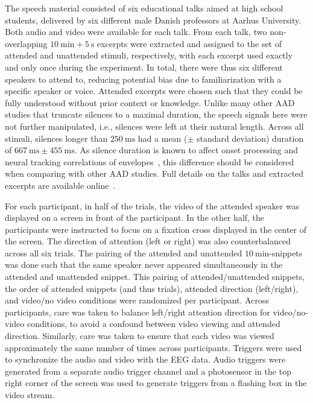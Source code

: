 \documentclass[fleqn,10pt]{wlscirep}
\begin{document}
	The speech material consisted of six educational talks aimed at high school students, delivered by six different male Danish professors at Aarhus University. Both audio and video were available for each talk. From each talk, two non-overlapping $\SI{10}{\minute}+\SI{5}{\second}$ excerpts were extracted and assigned to the set of attended and unattended stimuli, respectively, with each excerpt used exactly and only once during the experiment. In total, there were thus six different speakers to attend to, reducing potential bias due to familiarization with a specific speaker or voice. Attended excerpts were chosen such that they could be fully understood without prior context or knowledge. Unlike many other AAD studies that truncate silences to a maximal duration, the speech signals here were not further manipulated, i.e., silences were left at their natural length. Across all stimuli, silences longer than $\SI{250}{\milli\second}$ had a mean ($\pm$ standard deviation) duration of $\SI{667}{\milli\second} \pm \SI{455}{\milli\second}$. As silence duration is known to affect onset processing and neural tracking correlations of envelopes~\cite{deoisres2023continuous}, this difference should be considered when comparing with other AAD studies. Full details on the talks and extracted excerpts are available online~\cite{geirnaert2025ear}.
	
	For each participant, in half of the trials, the video of the attended speaker was displayed on a screen in front of the participant. In the other half, the participants were instructed to focus on a fixation cross displayed in the center of the screen. The direction of attention (left or right) was also counterbalanced across all six trials. The pairing of the attended and unattended $\SI{10}{\minute}$-snippets was done such that the same speaker never appeared simultaneously in the attended and unattended snippet. This pairing of attended/unattended snippets, the order of attended snippets (and thus trials), attended direction (left/right), and video/no video conditions were randomized per participant. Across participants, care was taken to balance left/right attention direction for video/no-video conditions, to avoid a confound between video viewing and attended direction. Similarly, care was taken to ensure that each video was viewed approximately the same number of times across participants. Triggers were used to synchronize the audio and video with the EEG data. Audio triggers were generated from a separate audio trigger channel and a photosensor in the top right corner of the screen was used to generate triggers from a flashing box in the video stream.
	
\end{document}
